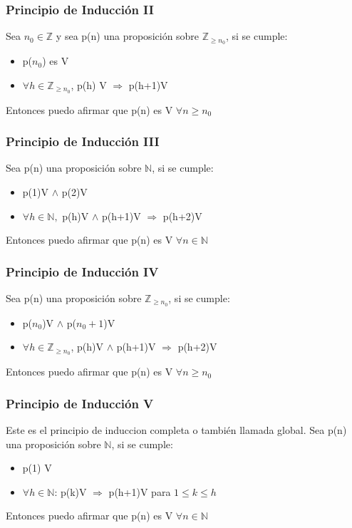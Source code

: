 \documentclass{report}
\begin{document}
\subsubsection{Principio de Inducción II}
Sea $n_0 \in \mathbb{Z}$ y sea p(n) una proposición sobre $\mathbb{Z}_{\geq n_0}$, si se cumple: \begin{itemize}
    \item p($n_0$) es V
    \item $\forall h \in \mathbb{Z}_{\geq n_0}$, p(h) V $\Rightarrow$ p(h+1)V
\end{itemize}
Entonces puedo afirmar que p(n) es V $\forall n \geq n_0$

\subsubsection{Principio de Inducción III}
Sea p(n) una proposición sobre $\mathbb {N}$, si se cumple:
\begin{itemize}
    \item p(1)V $\land$ p(2)V
    \item $\forall h \in \mathbb {N},$ p(h)V $\land$ p(h+1)V $\Rightarrow$ p(h+2)V
\end{itemize}
Entonces puedo afirmar que p(n) es V $\forall n \in \mathbb{N}$

\subsubsection{Principio de Inducción IV}
Sea p(n) una proposición sobre $\mathbb{Z}_{\geq n_0}$, si se cumple:
\begin{itemize}
    \item p($n_0$)V $\land$ p($n_0 + 1$)V
    \item $\forall h \in \mathbb{Z}_{\geq n_0}$, p(h)V $\land$ p(h+1)V $\Rightarrow$ p(h+2)V
\end{itemize}
Entonces puedo afirmar que p(n) es V $\forall n \geq n_0$

\subsubsection{Principio de Inducción V}
Este es el principio de induccion completa o también llamada global. Sea p(n) una proposición sobre $\mathbb {N}$, si se cumple:
\begin{itemize}
    \item p(1) V
    \item $\forall h \in \mathbb{N}$: p(k)V $\Rightarrow$ p(h+1)V para $1 \leq k \leq h$
\end{itemize}
Entonces puedo afirmar que p(n) es V $\forall n \in \mathbb{N}$
\end{document}
